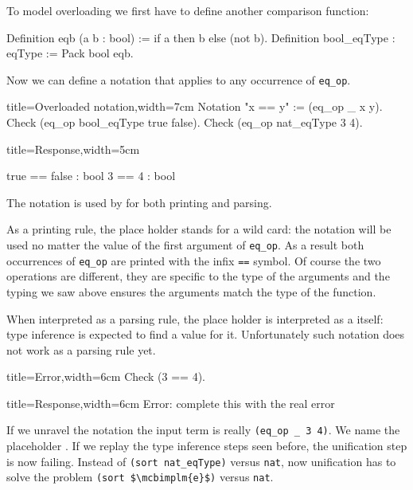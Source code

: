To model overloading we first have to define another comparison
function:

\begin{coq}{}
Definition eqb (a b : bool) := if a then b else (not b).
Definition bool_eqType : eqType := Pack bool eqb.
\end{coq}

Now we can define a notation that applies to any occurrence of
\lstinline/eq_op/.

\begin{coq}{title=Overloaded notation,width=7cm}
Notation "x == y" := (eq_op _ x y).
Check (eq_op bool_eqType true false).
Check (eq_op nat_eqType 3 4).
\end{coq}
\begin{coqout}{title=Response,width=5cm}

true == false : bool
3 == 4 : bool
\end{coqout}

The notation is used by \Coq{} for both printing and parsing.

As a printing rule, the place holder stands for a wild card: the
notation will be used no matter the value of the first argument of
\lstinline/eq_op/.  As a result both occurrences of \lstinline/eq_op/
are printed with the infix \lstinline/==/ symbol.  Of course the two
operations are different, they are specific to the type of the
arguments and the typing we saw above ensures the arguments match the
type of the function.

When interpreted as a parsing rule, the place holder is interpreted
as a itself: type inference is expected to find a value for it.
Unfortunately such notation does not work as a parsing rule yet.

\begin{coq}{title=Error,width=6cm}
Check (3 == 4).
$~$
\end{coq}
\begin{coqout}{title=Response,width=6cm}
Error: complete this
with the real error
\end{coqout}

If we unravel the notation the input term is really
\lstinline/(eq_op _ 3 4)/. We name the placeholder .
If we replay the type inference steps seen before, the unification
step is now failing.  Instead of \lstinline/(sort nat_eqType)/
versus \lstinline/nat/, now unification has to solve the problem
\lstinline/(sort $\mcbimplm{e}$)/ versus \lstinline/nat/.


